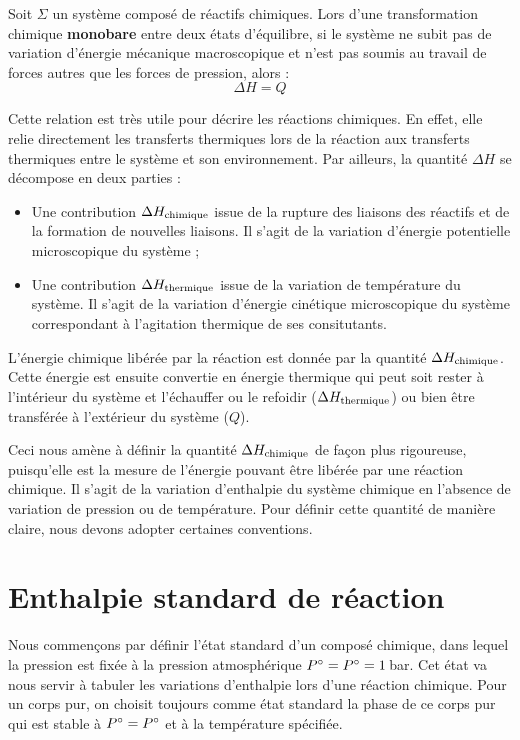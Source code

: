 \documentclass[11pt,fleqn]{book} %
\begin{document}
\begin{proposition}
    Soit $\Sigma$ un système composé de réactifs chimiques. Lors d'une transformation chimique \textbf{monobare} entre deux états d'équilibre, si le système ne subit pas de variation d'énergie mécanique macroscopique et n'est pas soumis au travail de forces autres que les forces de pression, alors :
    \begin{equation}
        \Delta H = Q
    \end{equation}
\end{proposition}

Cette relation est très utile pour décrire les réactions chimiques. En effet, elle relie directement les transferts thermiques lors de la réaction aux transferts thermiques entre le système et son environnement. Par ailleurs, la quantité $\Delta H$ se décompose en deux parties :
\begin{itemize}
    \item Une contribution $\Delta H_{\rm chimique}$ issue de la rupture des liaisons des réactifs et de la formation de nouvelles liaisons. Il s'agit de la variation d'énergie potentielle microscopique du système ;
    \item Une contribution $\Delta H_{\rm thermique}$ issue de la variation de température du système. Il s'agit de la variation d'énergie cinétique microscopique du système correspondant à l'agitation thermique de ses consitutants.    
\end{itemize}

L'énergie chimique libérée par la réaction est donnée par la quantité $\Delta H_{\rm chimique}$. Cette énergie est ensuite convertie en énergie thermique qui peut soit rester à l'intérieur du système et l'échauffer ou le refoidir ($\Delta H_{\rm thermique}$) ou bien être transférée à l'extérieur du système ($Q$). 

Ceci nous amène à définir la quantité $\Delta H_{\rm chimique}$ de façon plus rigoureuse, puisqu'elle est la mesure de l'énergie pouvant être libérée par une réaction chimique. Il s'agit de la variation d'enthalpie du système chimique en l'absence de variation de pression ou de température. Pour définir cette quantité de manière claire, nous devons adopter certaines conventions.

\section{Enthalpie standard de réaction}

Nous commençons par définir l'état standard d'un composé chimique, dans lequel la pression est fixée à la pression atmosphérique $P \degree = P^\circ = 1$\,bar. Cet état va nous servir à tabuler les variations d'enthalpie lors d'une réaction chimique. Pour un corps pur, on choisit toujours comme état standard la phase de ce corps pur qui est stable à $P \degree = P^\circ$ et à la température spécifiée.
\end{document}
